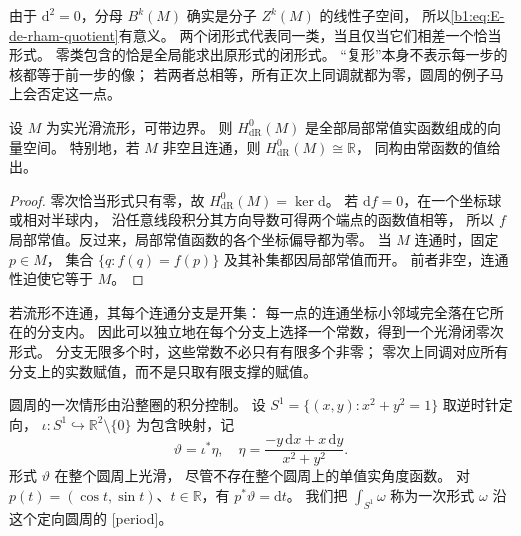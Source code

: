 由于 \(\mathrm d^2=0\)，分母 \(B^k(M)\) 确实是分子 \(Z^k(M)\) 的线性子空间，
所以\eqref{b1:eq:E-de-rham-quotient}有意义。
两个闭形式代表同一类，当且仅当它们相差一个恰当形式。
零类包含的恰是全局能求出原形式的闭形式。
“复形”本身不表示每一步的核都等于前一步的像；
若两者总相等，所有正次上同调就都为零，圆周的例子马上会否定这一点。

\begin{proposition}[零次上同调]\label{b1:prop:E-de-rham-zero}
设 \(M\) 为实光滑流形，可带边界。
则 \(H_{\mathrm{dR}}^0(M)\) 是全部局部常值实函数组成的向量空间。
特别地，若 \(M\) 非空且连通，则 \(H_{\mathrm{dR}}^0(M)\cong\mathbb R\)，
同构由常函数的值给出。
\end{proposition}
\begin{proof}
零次恰当形式只有零，故 \(H_{\mathrm{dR}}^0(M)=\ker\mathrm d\)。
若 \(\mathrm df=0\)，在一个坐标球或相对半球内，
沿任意线段积分其方向导数可得两个端点的函数值相等，
所以 \(f\) 局部常值。反过来，局部常值函数的各个坐标偏导都为零。
当 \(M\) 连通时，固定 \(p\in M\)，
集合 \(\{q:f(q)=f(p)\}\) 及其补集都因局部常值而开。
前者非空，连通性迫使它等于 \(M\)。
\end{proof}

若流形不连通，其每个连通分支是开集：
每一点的连通坐标小邻域完全落在它所在的分支内。
因此可以独立地在每个分支上选择一个常数，得到一个光滑闭零次形式。
分支无限多个时，这些常数不必只有有限多个非零；
零次上同调对应所有分支上的实数赋值，而不是只取有限支撑的赋值。

\ProseParagraphBreak

圆周的一次情形由沿整圈的积分控制。
设 \(S^1=\{(x,y):x^2+y^2=1\}\) 取逆时针定向，
\(\iota:S^1\hookrightarrow\mathbb R^2\setminus\{0\}\) 为包含映射，记
\[
 \vartheta=\iota^*\eta,
 \quad \eta=\frac{-y\,\mathrm dx+x\,\mathrm dy}{x^2+y^2}.
\]
形式 \(\vartheta\) 在整个圆周上光滑，
尽管不存在整个圆周上的单值实角度函数。
对 \(p(t)=(\cos t,\sin t)\)、\(t\in\mathbb R\)，有
\(p^*\vartheta=\mathrm dt\)。
我们把 \(\int_{S^1}\omega\) 称为一次形式 \(\omega\) 沿这个定向圆周的
[period]。

